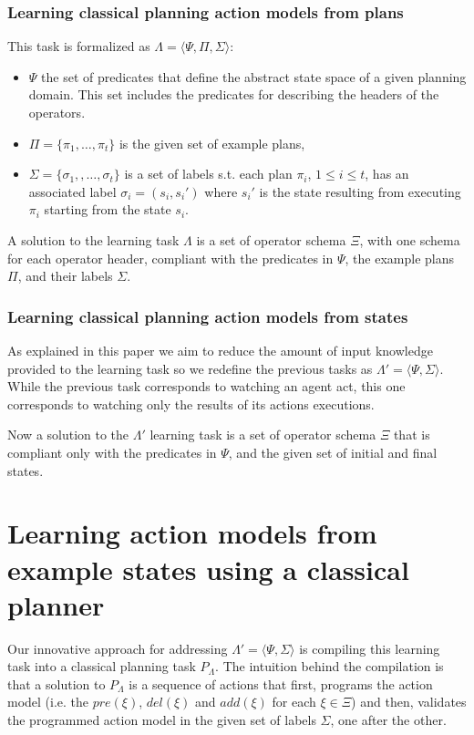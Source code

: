\documentclass[letterpaper]{article} %
\newcommand{\tup}[1]{{\langle #1 \rangle}}
\begin{document}
\subsubsection{Learning classical planning action models from plans}
This task is formalized as $\Lambda=\tup{\Psi,\Pi,\Sigma}$: 
\begin{itemize}
\item $\Psi$ the set of predicates that define the abstract state space of a given planning domain. This set includes the predicates for describing the headers of the operators.
\item $\Pi=\{\pi_1,\ldots,\pi_t\}$ is the given set of example plans,
\item $\Sigma=\{\sigma_1,,\ldots,\sigma_t\}$ is a set of labels s.t. each plan $\pi_i$, {\small $1\leq i\leq t$}, has an associated label $\sigma_i=(s_i,s_i')$ where $s_i'$ is the state resulting from executing $\pi_i$ starting from the state $s_i$. 
\end{itemize}

A solution to the learning task $\Lambda$ is a set of operator schema $\Xi$, with one schema for each operator header, compliant with the predicates in $\Psi$, the example plans $\Pi$, and their labels $\Sigma$.


\subsubsection{Learning classical planning action models from states}
As explained in this paper we aim to reduce the amount of input knowledge provided to the learning task so we redefine the previous tasks as $\Lambda'=\tup{\Psi,\Sigma}$. While the previous task corresponds to watching an agent act, this one corresponds to watching only the results of its actions executions.

Now a solution to the $\Lambda'$ learning task is a set of operator schema $\Xi$ that is compliant only with the predicates in $\Psi$, and the given set of initial and final states.


\section{Learning action models from example states using a classical planner}
Our innovative approach for addressing $\Lambda'=\tup{\Psi,\Sigma}$ is compiling this learning task into a classical planning task $P_{\Lambda}$. The intuition behind the compilation is that a solution to $P_{\Lambda}$ is a sequence of actions that first, programs the action model (i.e. the $pre(\xi)$, $del(\xi)$ and $add(\xi)$ for each $\xi\in\Xi$) and then, validates the programmed action model in the given set of labels $\Sigma$, one after the other.
\end{document}
